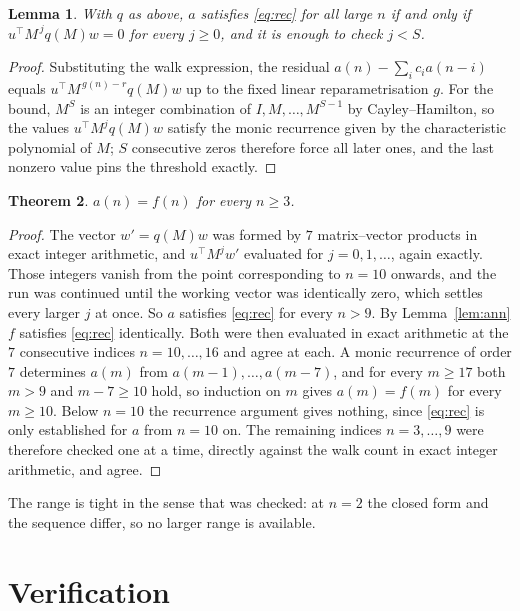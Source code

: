 \documentclass[11pt,a4paper]{article}
\theoremstyle{plain}
\newtheorem{theorem}{Theorem}
\newtheorem{lemma}[theorem]{Lemma}
\theoremstyle{definition}
\begin{document}
\begin{lemma}\label{lem:crit}
With $q$ as above, $a$ satisfies \eqref{eq:rec} for all large $n$ if and only if
$u^{\!\top}M^{\,j}q(M)w=0$ for every $j\ge0$, and it is enough to check $j<S$.
\end{lemma}

\begin{proof}
Substituting the walk expression, the residual $a(n)-\sum_ic_ia(n-i)$ equals
$u^{\!\top}M^{\,g(n)-r}q(M)w$ up to the fixed linear reparametrisation $g$. For the bound,
$M^{S}$ is an integer combination of $I,M,\dots,M^{S-1}$ by Cayley--Hamilton, so the values
$u^{\!\top}M^{j}q(M)w$ satisfy the monic recurrence given by the characteristic polynomial of
$M$; $S$ consecutive zeros therefore force all later ones, and the last nonzero value pins the
threshold exactly.
\end{proof}

\begin{theorem}
$a(n)=f(n)$ for every $n\ge3$.
\end{theorem}

\begin{proof}
The vector $w'=q(M)w$ was formed by $7$ matrix--vector products in exact integer
arithmetic, and $u^{\!\top}M^{j}w'$ evaluated for $j=0,1,\dots$, again exactly. Those integers
vanish from the point corresponding to $n=10$ onwards, and the run was continued until the
working vector was identically zero, which settles every larger $j$ at once. So $a$ satisfies
\eqref{eq:rec} for every $n>9$. By Lemma~\ref{lem:ann} $f$ satisfies \eqref{eq:rec}
identically. Both were then evaluated in exact arithmetic at the $7$ consecutive indices
$n=10,\dots,16$ and agree at each. A monic recurrence of order $7$
determines $a(m)$ from $a(m-1),\dots,a(m-7)$, and for every $m\ge17$ both
$m>9$ and $m-7\ge10$ hold, so induction on $m$ gives $a(m)=f(m)$ for every
$m\ge10$.
Below $n=10$ the recurrence argument gives nothing, since \eqref{eq:rec} is only
established for $a$ from $n=10$ on. The remaining indices $n=3,\dots,9$ were
therefore checked one at a time, directly against the walk count in exact integer arithmetic,
and agree.
\end{proof}

The range is tight in the sense that was checked: at $n=2$ the closed form and the sequence differ, so no larger range is available.

\section{Verification}
\end{document}
